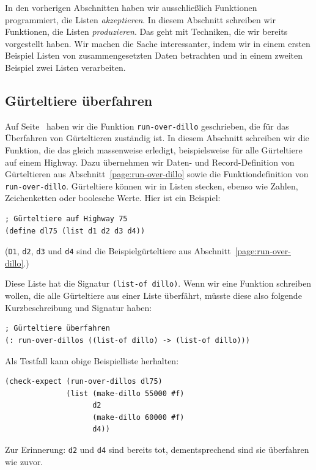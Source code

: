 In den vorherigen Abschnitten haben wir ausschließlich Funktionen
programmiert, die Listen \emph{akzeptieren}.  In diesem Abschnitt
schreiben wir Funktionen, die Listen \emph{produzieren}.  Das geht mit
Techniken, die wir bereits vorgestellt haben.  Wir machen die Sache
interessanter, indem wir in einem ersten Beispiel Listen von
zusammengesetzten Daten betrachten und in einem zweiten Beispiel zwei
Listen verarbeiten.

\subsection{Gürteltiere überfahren}

Auf Seite~\pageref{page:run-over-dillo} haben wir die Funktion
\texttt{run-over-dillo} geschrieben, die für das Überfahren von
Gürteltieren zuständig ist.  In diesem Abschnitt schreiben wir die
Funktion, die das gleich massenweise erledigt, beispielsweise für alle
Gürteltiere auf einem Highway.  Dazu übernehmen wir Daten- und
Record-Definition von Gürteltieren aus
Abschnitt~\ref{page:run-over-dillo} sowie die Funktiondefinition von
\texttt{run-over-dillo}.  Gürteltiere können wir in Listen stecken,
ebenso wie Zahlen, Zeichenketten oder boolesche Werte.  Hier ist ein
Beispiel:
%
\begin{verbatim}
; Gürteltiere auf Highway 75
(define dl75 (list d1 d2 d3 d4))
\end{verbatim}
(\texttt{D1}, \texttt{d2}, \texttt{d3} und \texttt{d4} sind die
Beispielgürteltiere aus Abschnitt~\ref{page:run-over-dillo}.)

Diese Liste hat die Signatur \texttt{(list-of dillo)}.  Wenn wir eine
Funktion schreiben wollen, die alle Gürteltiere aus einer Liste
überfährt, müsste diese also folgende Kurzbeschreibung und Signatur
haben:
%
\begin{verbatim}
; Gürteltiere überfahren
(: run-over-dillos ((list-of dillo) -> (list-of dillo)))
\end{verbatim}
%
Als Testfall kann obige Beispielliste herhalten:
%
\begin{verbatim}
(check-expect (run-over-dillos dl75)
              (list (make-dillo 55000 #f)
                    d2
                    (make-dillo 60000 #f)
                    d4))
\end{verbatim}
%
Zur Erinnerung: \texttt{d2} und \texttt{d4} sind bereits tot,
dementsprechend sind sie überfahren wie zuvor.

